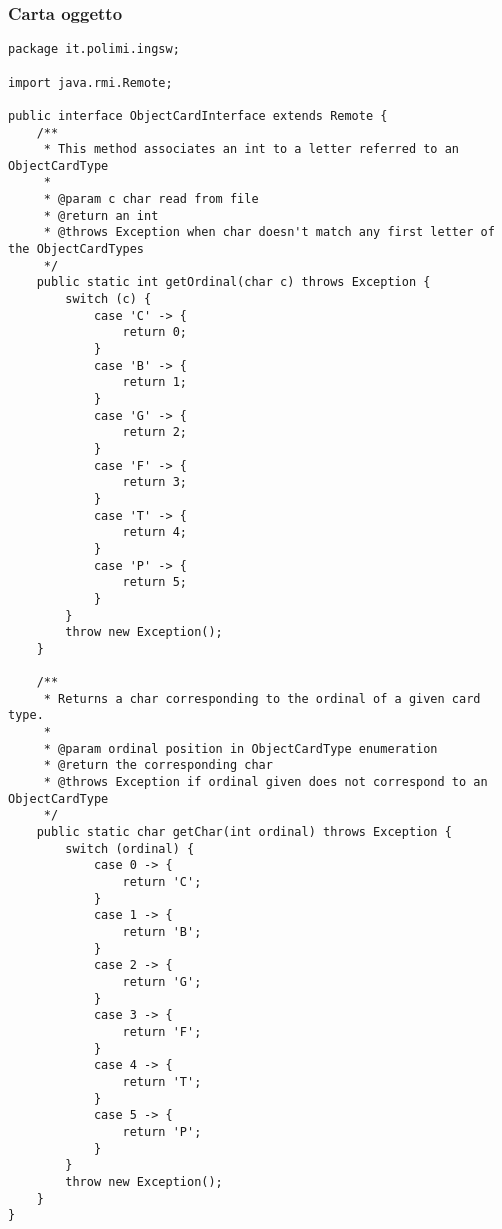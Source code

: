 \documentclass[a4paper,11pt]{article} %
\begin{document}
    \newpage

    \subsubsection{Carta oggetto}

    \begin{verbatim}
package it.polimi.ingsw;

import java.rmi.Remote;

public interface ObjectCardInterface extends Remote {
    /**
     * This method associates an int to a letter referred to an ObjectCardType
     *
     * @param c char read from file
     * @return an int
     * @throws Exception when char doesn't match any first letter of the ObjectCardTypes
     */
    public static int getOrdinal(char c) throws Exception {
        switch (c) {
            case 'C' -> {
                return 0;
            }
            case 'B' -> {
                return 1;
            }
            case 'G' -> {
                return 2;
            }
            case 'F' -> {
                return 3;
            }
            case 'T' -> {
                return 4;
            }
            case 'P' -> {
                return 5;
            }
        }
        throw new Exception();
    }

    /**
     * Returns a char corresponding to the ordinal of a given card type.
     *
     * @param ordinal position in ObjectCardType enumeration
     * @return the corresponding char
     * @throws Exception if ordinal given does not correspond to an ObjectCardType
     */
    public static char getChar(int ordinal) throws Exception {
        switch (ordinal) {
            case 0 -> {
                return 'C';
            }
            case 1 -> {
                return 'B';
            }
            case 2 -> {
                return 'G';
            }
            case 3 -> {
                return 'F';
            }
            case 4 -> {
                return 'T';
            }
            case 5 -> {
                return 'P';
            }
        }
        throw new Exception();
    }
}
    \end{verbatim}

    \newpage
\end{document}
